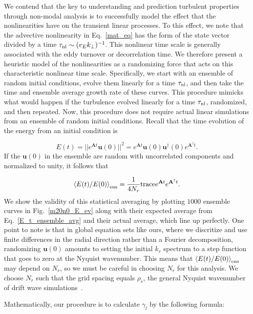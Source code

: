 \documentclass[letter,scriptaddress,twocolumn, prl,showkeys]{revtex4}
\def\beq{\begin{equation}}
\def\eeq{\end{equation}}
\begin{document}
We contend that the key to understanding and prediction turbulent properties through non-modal analysis is to successfully model the effect that the nonlinearities have on the transient linear processes. 
To this effect, we note that the advective nonlinearity in Eq.~\ref{mat_eq} has the form of the state vector divided by a time $\tau_{\rm{nl}} \sim (v_E k_\perp)^{-1}$. This nonlinear
time scale is generally associated with the eddy turnover or decorrelation time. We therefore present a heuristic model of the nonlinearities 
as a randomizing force that acts on this characteristic nonlinear time scale.
Specifically, we start with an ensemble of random initial conditions, evolve them linearly for a time $\tau_{\rm{nl}}$, and then take the time and ensemble average growth rate of these curves.
This procedure mimicks what would happen if the turbulence evolved linearly for a time $\tau_{\rm{nl}}$, randomized, and then repeated. Now, this procedure does not require actual linear
simulations from an ensemble of random initial conditions. Recall that the time evolution of the energy from an initial condition is

\beq
\label{E_t_from_u0}
E(t) = ||e^{\mathbf{A} t} \mathbf{u}(0)||^2 = e^{\mathbf{A} t} \mathbf{u}(0) \mathbf{u}^{\dagger}(0) e^{\mathbf{A}^{\dagger}t}.
\eeq
If the $\mathbf{u}(0)$ in the ensemble are random with uncorrelated components and normalized to unity, it follows that~\cite{camargo1998}

\beq
\label{E_t_ensemble_avg}
\left< E(t)/E(0) \right>_{{\rm{ens}}} = \frac{1}{4 N_r} {\rm{trace}} e^{\mathbf{A} t} e^{\mathbf{A}^{\dagger}t}.
\eeq
We show the validity of this statistical averaging by plotting $1000$ ensemble curves in Fig.~\ref{m20n0_E_ev} along with their expected average from Eq.~\ref{E_t_ensemble_avg} and their actual average,
which line up perfectly.
One point to note is that in global equation sets like ours, where we discritize and use finite differences in the radial direction rather than a Fourier decomposition, randomizing $\mathbf{u}(0)$
amounts to setting the initial $k_r$ spectrum to a step function that goes to zero at the Nyquist wavenumber. This means that $\left< E(t)/E(0) \right>_{{\rm{ens}}}$ may depend on $N_r$, so we must be careful in
choosing $N_r$ for this analysis. We choose $N_r$ such that the grid spacing equals $\rho_s$, the general Nyquist wavenumber of drift wave simulations~\cite{scott1992}.

Mathematically, our procedure is to calculate $\gamma_l$ by the following formula:
\end{document}
